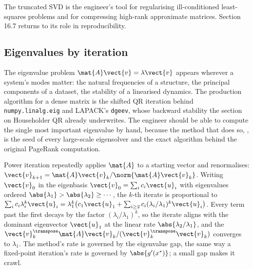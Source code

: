The truncated SVD is the engineer's tool for regularising
ill-conditioned least-squares problems and for compressing
high-rank approximate matrices. Section 16.7 returns to its role
in reproducibility.

\subsection{Eigenvalues by iteration}

The eigenvalue problem $\mat{A}\vect{v} = \lambda \vect{v}$ appears wherever a
system's modes matter: the natural frequencies of a structure, the principal
components of a dataset, the stability of a linearised dynamics. The
production algorithm for a dense matrix is the shifted QR iteration behind
\texttt{numpy.linalg.eig} and LAPACK's \texttt{dgeev}, whose backward
stability the section on Householder QR already underwrites. The engineer
should be able to compute the single most important eigenvalue by hand,
because the method that does so, , is the seed of
every large-scale eigensolver and the exact algorithm behind the original
PageRank computation.

Power iteration repeatedly applies $\mat{A}$ to a starting vector and
renormalises: $\vect{v}_{k+1} = \mat{A}\vect{v}_{k}/\norm{\mat{A}\vect{v}_{k}}$.
Writing $\vect{v}_{0}$ in the eigenbasis $\vect{v}_{0} = \sum_{i} c_{i}
\vect{u}_{i}$ with eigenvalues ordered $\abs{\lambda_{1}} > \abs{\lambda_{2}}
\geq \cdots$, the $k$-th iterate is proportional to $\sum_{i} c_{i}
\lambda_{i}^{k}\vect{u}_{i} = \lambda_{1}^{k}\big(c_{1}\vect{u}_{1} + \sum_{i
\geq 2} c_{i}(\lambda_{i}/\lambda_{1})^{k}\vect{u}_{i}\big)$. Every term past
the first decays by the factor $(\lambda_{i}/\lambda_{1})^{k}$, so the iterate
aligns with the dominant eigenvector $\vect{u}_{1}$ at the linear rate
$\abs{\lambda_{2}/\lambda_{1}}$, and the 
$\vect{v}_{k}^{\transpose}\mat{A}\vect{v}_{k}/(\vect{v}_{k}^{\transpose}
\vect{v}_{k})$ converges to $\lambda_{1}$. The method's rate is governed by
the eigenvalue gap, the same way a fixed-point iteration's rate is governed by
$\abs{g'(x^{*})}$; a small gap makes it crawl.


